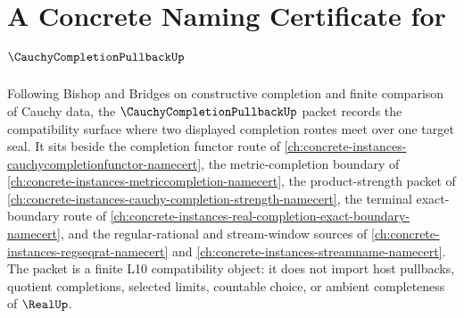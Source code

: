 \chapter{A Concrete Naming Certificate for $\CauchyCompletionPullbackUp$}
\label{ch:concrete-instances-cauchy-completion-pullback-namecert}

Following Bishop and Bridges on constructive completion and finite comparison of Cauchy data, the $\CauchyCompletionPullbackUp$ packet records the compatibility surface where two displayed completion routes meet over one target seal. It sits beside the completion functor route of \autoref{ch:concrete-instances-cauchycompletionfunctor-namecert}, the metric-completion boundary of \autoref{ch:concrete-instances-metriccompletion-namecert}, the product-strength packet of \autoref{ch:concrete-instances-cauchy-completion-strength-namecert}, the terminal exact-boundary route of \autoref{ch:concrete-instances-real-completion-exact-boundary-namecert}, and the regular-rational and stream-window sources of \autoref{ch:concrete-instances-regseqrat-namecert} and \autoref{ch:concrete-instances-streamname-namecert}. The packet is a finite L10 compatibility object: it does not import host pullbacks, quotient completions, selected limits, countable choice, or ambient completeness of $\RealUp$.

